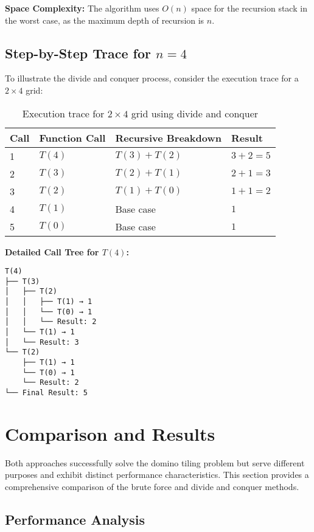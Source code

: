 \documentclass[conference]{IEEEtran}
\begin{document}
\textbf{Space Complexity:} The algorithm uses $O(n)$ space for the recursion stack in the worst case, as the maximum depth of recursion is $n$.

\subsection{Step-by-Step Trace for $n = 4$}

To illustrate the divide and conquer process, consider the execution trace for a $2 \times 4$ grid:

\begin{table}[htbp]
\centering
\caption{Execution trace for $2 \times 4$ grid using divide and conquer}
\label{tab:dc_trace}
\renewcommand{\arraystretch}{1.8}
\begin{tabular}{|p{1.0cm}|p{2.0cm}|p{2.0cm}|p{1.5cm}|}
\hline
\textbf{Call} & \textbf{Function Call} & \textbf{Recursive Breakdown} & \textbf{Result} \\
\hline
1 & $T(4)$ & $T(3) + T(2)$ & $3 + 2 = 5$ \\
\hline
2 & $T(3)$ & $T(2) + T(1)$ & $2 + 1 = 3$ \\
\hline
3 & $T(2)$ & $T(1) + T(0)$ & $1 + 1 = 2$ \\
\hline
4 & $T(1)$ & Base case & $1$ \\
\hline
5 & $T(0)$ & Base case & $1$ \\
\hline
\end{tabular}
\end{table}

\textbf{Detailed Call Tree for $T(4)$:}

\begin{verbatim}
T(4)
├── T(3)
│   ├── T(2)
│   │   ├── T(1) → 1
│   │   └── T(0) → 1
│   │   └── Result: 2
│   └── T(1) → 1
│   └── Result: 3
└── T(2)
    ├── T(1) → 1
    └── T(0) → 1
    └── Result: 2
└── Final Result: 5
\end{verbatim}

\section{Comparison and Results}

Both approaches successfully solve the domino tiling problem but serve different purposes and exhibit distinct performance characteristics. This section provides a comprehensive comparison of the brute force and divide and conquer methods.

\subsection{Performance Analysis}
\end{document}
